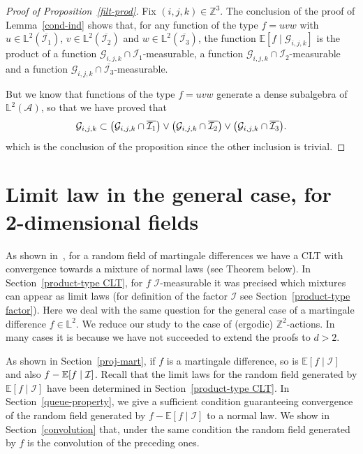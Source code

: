 \documentclass[10pt]{amsart}
\theoremstyle{definition}\newtheorem{defi}[theo]{Definition}\newtheorem{rema}[theo]{Remark}\newtheorem{exam}[theo]{Example}\newtheorem{exem}[theo]{Example}\newtheorem{nota}[theo]{Notation}
\newcommand{\Z}{\mathbb{Z}}
\newcommand*\bbL{\mathbb{L}}
\newcommand{\bbE}{\mathbb{E}}
\newcommand*\I{\mathcal{I}}
\newcommand*\A{\mathcal{A}}
\newcommand*\G{\mathcal{G}}
\let\originalleft\left
\let\originalright\right
\renewcommand{\left}{\mathopen{}\mathclose\bgroup\originalleft}
\renewcommand{\right}{\aftergroup\egroup\originalright}
\begin{document}
\begin{proof}[Proof of Proposition~\ref{filt-prod}]
Fix $(i,j,k)\in\Z^3$. The conclusion of the proof of Lemma~\ref{cond-ind} shows that, for any function of the type $f=uvw$ with $u\in \bbL^2(\overline{\I_1})$, $v\in \bbL^2(\overline{\I_2})$ and $w\in \bbL^2(\overline{\I_3})$, the function $\bbE[f\mid\G_{i,j,k}]$ is the product of a function $\G_{i,j,k}\cap\overline{\I_1}$-measurable, a function $\G_{i,j,k}\cap\overline{\I_2}$-measurable and a function $\G_{i,j,k}\cap\overline{\I_3}$-measurable.

But we know that functions of the type $f=uvw$ generate a dense subalgebra of $\bbL^2(\A)$, so that we have proved that
\[
\G_{i,j,k}\subset \left(\G_{i,j,k}\cap\overline{\I_1}\right)\vee\left(\G_{i,j,k}\cap\overline{\I_2}\right)\vee\left(\G_{i,j,k}\cap\overline{\I_3}\right).
\]
which is the conclusion of the proposition since the other inclusion is trivial.
\end{proof}



\section{Limit law in the general case, for 2-dimensional fields}\label{dim2}
As shown in~\cite{MR3913270}, for a random field of martingale differences we have a CLT with convergence towards a mixture of normal laws (see Theorem below). In Section~\ref{product-type CLT}, for $f$ $\I$-measurable it was precised which mixtures can appear as limit laws (for definition of the factor $\I$ see Section~\ref{product-type factor}). Here we deal with the same question for the general case of a martingale difference $f\in \bbL^2$. We reduce our study to the case of (ergodic) $\Z^2$-actions. In many cases it is because we have not succeeded to extend the proofs to $d>2$.

As shown in Section~\ref{proj-mart}, if $f$ is a martingale difference, so is $\bbE[f \mid \I]$ and also $f -\linebreak \bbE[f \mid \I]$. Recall that the limit laws for the random field generated by $\bbE[f \mid \I]$ have been determined in Section~\ref{product-type CLT}. In Section~\ref{queue-property}, we give a sufficient condition guaranteeing convergence of the random field generated by $f - \bbE[f \mid \I]$ to a normal law. We show in Section~\ref{convolution} that, under the same condition the random field generated by $f$ is the convolution of the preceding ones.
\end{document}

